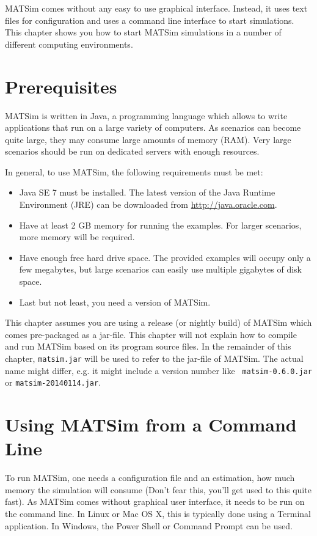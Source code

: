  
\bigskip

\begin{chapter-intro}
MATSim comes without any easy to use graphical interface. Instead, it uses text
files for configuration and uses a command line interface to start simulations.
This chapter shows you how to start MATSim simulations in a number of different
computing environments.
\end{chapter-intro}


\section{Prerequisites}

MATSim is written in Java, a programming language which allows to write
applications that run on a large variety of computers. As scenarios can become
quite large, they may consume large amounts of memory (RAM). Very large
scenarios should be run on dedicated servers with enough resources.

In general, to use MATSim, the following requirements must be met:
\begin{itemize}\styleItemize
  \item Java SE 7 must be installed. The latest version of the Java Runtime
  Environment (JRE) can be downloaded from \url{http://java.oracle.com}.
  \item Have at least 2 GB memory for running the examples. For larger
  scenarios, more memory will be required.
  \item Have enough free hard drive space. The provided examples will occupy
  only a few megabytes, but large scenarios can easily use multiple gigabytes of
  disk space.
  \item Last but not least, you need a version of MATSim.
\end{itemize}
This chapter assumes you are using a release (or nightly build) of MATSim which
comes pre-packaged as a jar-file. This chapter will not explain how to compile
and run MATSim based on its program source files. In the remainder of this
chapter, {\tt matsim.jar} will be used to refer to the jar-file of MATSim. The
actual name might differ, e.g. it might include a version number like {\tt
matsim-0.6.0.jar} or {\tt matsim-20140114.jar}.


\section{Using MATSim from a Command Line}
To run MATSim, one needs a configuration file and an estimation, how much memory
the simulation will consume (Don't fear this, you'll get used to this quite
fast). As MATSim comes without graphical user interface, it needs to be run on
the command line. In Linux or Mac OS X, this is typically done using a Terminal
application. In Windows, the Power Shell or Command Prompt can be used.

